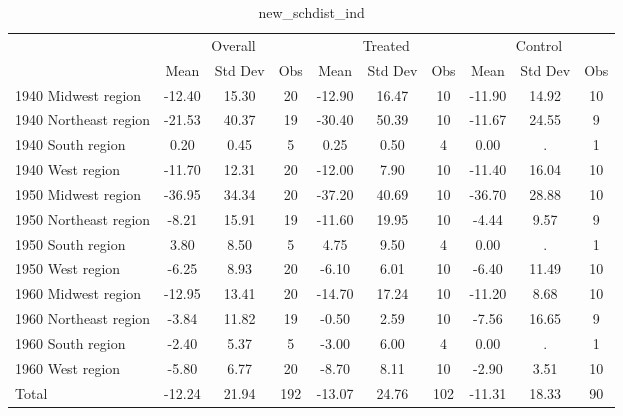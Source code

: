 \begin{table}[htbp]\centering
\def\sym#1{\ifmmode^{#1}\else\(^{#1}\)\fi}
\caption{new\_schdist\_ind \label{tab1}}
\begin{tabular}{l*{3}{ccc}}
\toprule
                    &\multicolumn{3}{c}{Overall}           &\multicolumn{3}{c}{Treated}           &\multicolumn{3}{c}{Control}           \\
                    &        Mean&     Std Dev&         Obs&        Mean&     Std Dev&         Obs&        Mean&     Std Dev&         Obs\\
\midrule
1940 Midwest region &      -12.40&       15.30&          20&      -12.90&       16.47&          10&      -11.90&       14.92&          10\\
1940 Northeast region&      -21.53&       40.37&          19&      -30.40&       50.39&          10&      -11.67&       24.55&           9\\
1940 South region   &        0.20&        0.45&           5&        0.25&        0.50&           4&        0.00&           .&           1\\
1940 West region    &      -11.70&       12.31&          20&      -12.00&        7.90&          10&      -11.40&       16.04&          10\\
1950 Midwest region &      -36.95&       34.34&          20&      -37.20&       40.69&          10&      -36.70&       28.88&          10\\
1950 Northeast region&       -8.21&       15.91&          19&      -11.60&       19.95&          10&       -4.44&        9.57&           9\\
1950 South region   &        3.80&        8.50&           5&        4.75&        9.50&           4&        0.00&           .&           1\\
1950 West region    &       -6.25&        8.93&          20&       -6.10&        6.01&          10&       -6.40&       11.49&          10\\
1960 Midwest region &      -12.95&       13.41&          20&      -14.70&       17.24&          10&      -11.20&        8.68&          10\\
1960 Northeast region&       -3.84&       11.82&          19&       -0.50&        2.59&          10&       -7.56&       16.65&           9\\
1960 South region   &       -2.40&        5.37&           5&       -3.00&        6.00&           4&        0.00&           .&           1\\
1960 West region    &       -5.80&        6.77&          20&       -8.70&        8.11&          10&       -2.90&        3.51&          10\\
Total               &      -12.24&       21.94&         192&      -13.07&       24.76&         102&      -11.31&       18.33&          90\\
\bottomrule
\end{tabular}
\end{table}
